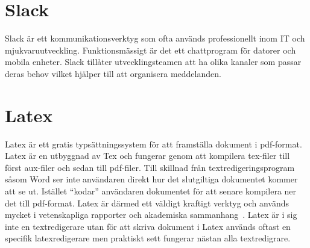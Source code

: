 \section{Slack}
Slack är ett kommunikationsverktyg som ofta används professionellt inom IT och mjukvaruutveckling. Funktionsmässigt är det ett chattprogram för datorer och mobila enheter. Slack tillåter utvecklingsteamen att ha olika kanaler som passar deras behov vilket hjälper till att organisera meddelanden.~\cite{Slack}

\section{Latex}
Latex är ett gratis typsättningssystem för att framställa dokument i pdf-format. Latex är en utbyggnad av Tex och fungerar genom att kompilera tex-filer till först aux-filer och sedan till pdf-filer. Till skillnad från textredigeringsprogram såsom Word ser inte användaren direkt hur det slutgiltiga dokumentet kommer att se ut. Istället ``kodar'' användaren dokumentet för att senare kompilera ner det till pdf-format. Latex är därmed ett väldigt kraftigt verktyg och används mycket i vetenskapliga rapporter och akademiska sammanhang~\cite{ctan}. Latex är i sig inte en textredigerare utan för att skriva dokument i Latex används oftast en specifik latexredigerare men praktiskt sett fungerar nästan alla textredigrare.
